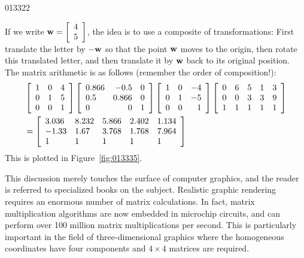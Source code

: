 \begin{example}{}{013322}
\begin{solution}
\setlength{\rightskip}{0pt plus 200pt}
If we write $\textbf{w} = \left[
\begin{array}{c}
4\\
5
\end{array}
\right]$, the idea is to use a composite of transformations: First translate the letter by $-\textbf{w}$ so that the point $\textbf{w}$ moves to the origin, then rotate this translated letter, and then translate it by $\textbf{w}$ back to its original position. The matrix arithmetic is as follows (remember the order of composition!):
\begin{align*}
& \left[
\begin{array}{rrr}
1 & 0 & 4\\
0 & 1 & 5\\
0 & 0 & 1
\end{array}
\right]
\left[
\begin{array}{lrr}
0.866 & -0.5 & 0\\
0.5 & 0.866 & 0\\
0 & 0 & 1
\end{array}
\right]
\left[
\begin{array}{rrr}
1 & 0 & -4\\
0 & 1 & -5\\
0 & 0 & 1
\end{array}
\right]
\left[
\begin{array}{rrrrr}
0 & 6 & 5 & 1 & 3\\
0 & 0 & 3 & 3 & 9 \\
1 & 1 & 1 & 1 & 1
\end{array}
\right] \\
&= \left[
\begin{array}{lllll}
3.036 & 8.232 & 5.866 & 2.402 & 1.134\\
-1.33 & 1.67 & 3.768 & 1.768 & 7.964 \\
1 & 1 & 1 & 1 & 1
\end{array}
\right]
\end{align*}
This is plotted in Figure~\ref{fig:013335}.

\end{solution}
\end{example}

This discussion merely touches the 
surface of computer graphics, and the reader is referred to specialized 
books on the subject. Realistic graphic rendering requires an enormous 
number of matrix calculations. In fact, matrix multiplication algorithms
 are now embedded in microchip circuits, and can perform over 100 
million matrix multiplications per second. This is particularly 
important in the field of three-dimensional graphics where the 
homogeneous coordinates have four components and $4 \times 4$ matrices are 
required.


